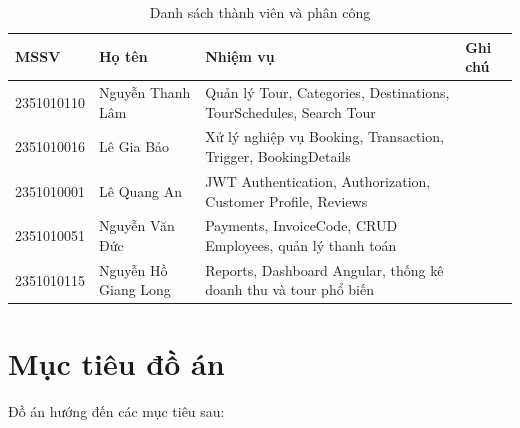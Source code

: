 \begin{table}[H]
\centering
\renewcommand{\arraystretch}{1.5}

\begin{tabular}{|p{2.5cm}|p{3.5cm}|p{7cm}|p{2.2cm}|}
\hline

\centering \textbf{MSSV} &
\centering \textbf{Họ tên} &
\centering \textbf{Nhiệm vụ} &
\centering \textbf{Ghi chú}
\tabularnewline
\hline

2351010110 &
Nguyễn Thanh Lâm &
Quản lý Tour, Categories, Destinations, TourSchedules, Search Tour &

\tabularnewline
\hline

2351010016 &
Lê Gia Bảo &
Xử lý nghiệp vụ Booking, Transaction, Trigger, BookingDetails &
\tabularnewline
\hline

2351010001 &
Lê Quang An &
JWT Authentication, Authorization, Customer Profile, Reviews &
\tabularnewline
\hline

2351010051 &
Nguyễn Văn Đức &
Payments, InvoiceCode, CRUD Employees, quản lý thanh toán &
\tabularnewline
\hline

2351010115 &
Nguyễn Hồ Giang Long &
Reports, Dashboard Angular, thống kê doanh thu và tour phổ biến &
\tabularnewline
\hline

\end{tabular}

\caption{Danh sách thành viên và phân công}
\label{table:phancong}

\end{table}

\section{Mục tiêu đồ án}

\noindent Đồ án hướng đến các mục tiêu sau:

